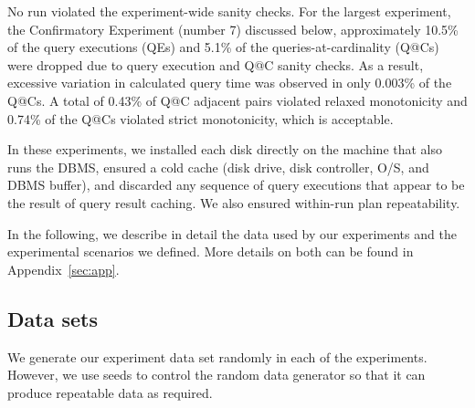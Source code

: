 \documentclass[prodmode,acmtods]{acmsmall}
\begin{document}
No run violated the experiment-wide sanity checks. For the largest
experiment, the Confirmatory Experiment (number 7) discussed below, approximately
10.5\% of the query executions (QEs) and 5.1\%
of the queries-at-cardinality (Q@Cs) were dropped due to query execution
and Q@C sanity checks. As a result, excessive variation in calculated query
time was observed in only 0.003\% of the Q@Cs. A total of 0.43\% of Q@C adjacent
pairs violated relaxed monotonicity and 0.74\% of the Q@Cs violated strict
monotonicity, which is acceptable.


In these experiments, we  installed each disk directly
on the machine that also runs the DBMS, ensured a cold cache (disk drive,
disk controller, O/S, and DBMS buffer), and discarded any sequence of query
executions that appear to be the result of query result caching. We also
ensured within-run plan repeatability.

In the following, we describe in detail the data used by our experiments and
the experimental scenarios we defined. More details on both
can be found in Appendix~\ref{sec:app}.

\subsection{Data sets}\label{sec:datasets}
We generate our experiment data set randomly in each of the experiments. However, we
use seeds to control the random data generator so that it can produce
repeatable data as required.
\end{document}

